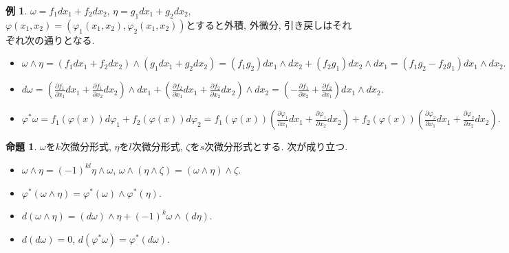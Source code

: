 \documentclass[dvipdfmx,a4paper,11pt]{article}
\theoremstyle{definition}
\newtheorem{prop}[thm]{命題}
\newtheorem{exa}[thm]{例}
\newtheorem{rem}[thm]{補足}
\newcommand{\pdrv}[2]{\frac{\partial #1}{\partial #2}}
\begin{document}
 
 \begin{exa}

 $\omega=f_1dx_1+ f_2dx_2$,  $\eta=g_1dx_1+ g_2dx_2$, $\varphi (x_1, x_2) = (\varphi_1(x_1,x_2), \varphi_2(x_1,x_2))$とすると外積, 外微分, 引き戻しはそれぞれ次の通りとなる. 
    \begin{itemize}
    \setlength{\parskip}{0cm}
  \setlength{\itemsep}{2pt} 
\item  $
 \omega \wedge \eta = (f_1dx_1+ f_2dx_2) \wedge (g_1dx_1+ g_2dx_2)
 = (f_1g_2)dx_1 \wedge dx_2 + (f_2g_1)dx_2 \wedge dx_1 = (f_1g_2 - f_2 g_1) dx_1 \wedge dx_2.
 $
\item  $
 d \omega = \left(\pdrv{f_1}{x_1} dx_1+ \pdrv{f_1}{x_2} dx_2\right) \wedge dx_1 + \left(\pdrv{f_2}{x_1} dx_1+ \pdrv{f_2}{x_2} dx_2\right) \wedge dx_2
= \left( -\pdrv{f_1}{x_2} + \pdrv{f_2}{x_1}\right)dx_1 \wedge dx_2.
  $
  \item
  $
 \varphi^{*}\omega
=
 f_{1} (\varphi(x)) d\varphi_{1} +  f_{2} (\varphi(x)) d\varphi_{2}
 =
  f_{1} (\varphi(x)) \left(\pdrv{\varphi_1}{x_1} dx_1 + \pdrv{\varphi_1}{x_2} dx_2 \right) 
  +  f_{2} (\varphi(x)) \left(\pdrv{\varphi_2}{x_1} dx_1 + \pdrv{\varphi_2}{x_2} dx_2 \right). 
$
 \end{itemize}
 
 \end{exa}


  \begin{tcolorbox}[
    colback = white,
    colframe = green!35!black,
    fonttitle = \bfseries,
    breakable = true]
\begin{prop}
$\omega$を$k$次微分形式, $\eta$を$l$次微分形式, $\zeta$を$s$次微分形式とする. 次が成り立つ.
\begin{itemize}
 \setlength{\parskip}{0cm}
  \setlength{\itemsep}{2pt} 
\item$\omega \wedge \eta = (-1)^{kl} \eta \wedge \omega$, $\omega \wedge (\eta  \wedge \zeta)= (\omega \wedge \eta)  \wedge \zeta$. 
\item $\varphi^{*}(\omega \wedge \eta) = \varphi^{*}(\omega) \wedge \varphi^{*}(\eta)$.
\item $d(\omega \wedge \eta ) = (d \omega) \wedge \eta + (-1)^{k}\omega \wedge (d \eta)$.
    \item $d(d \omega)=0$, $d(\varphi^{*}\omega)=\varphi^{*}(d \omega)$.
\end{itemize}
    \end{prop}
    \end{tcolorbox}
  
\end{document}

